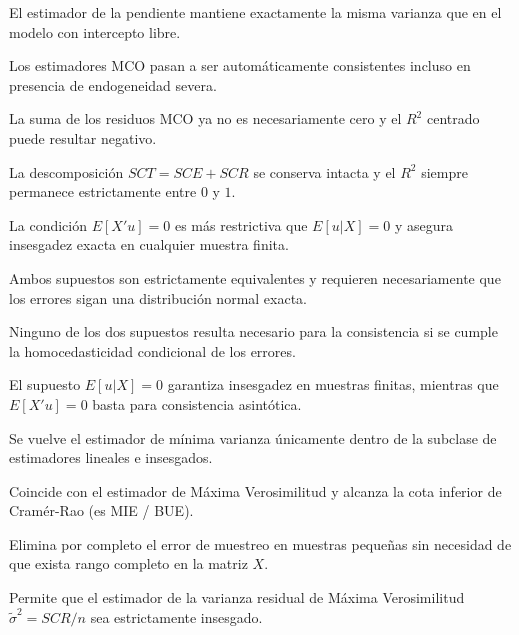 \begin{opts}
    \item El estimador de la pendiente mantiene exactamente la misma varianza que en el modelo con intercepto libre.
    \item Los estimadores MCO pasan a ser automáticamente consistentes incluso en presencia de endogeneidad severa.
    \item La suma de los residuos MCO ya no es necesariamente cero y el $R^2$ centrado puede resultar negativo.
    \item La descomposición $SCT = SCE + SCR$ se conserva intacta y el $R^2$ siempre permanece estrictamente entre $0$ y $1$.
\end{opts}

\begin{opts}
    \item La condición $E[X'u] = 0$ es más restrictiva que $E[u|X] = 0$ y asegura insesgadez exacta en cualquier muestra finita.
    \item Ambos supuestos son estrictamente equivalentes y requieren necesariamente que los errores sigan una distribución normal exacta.
    \item Ninguno de los dos supuestos resulta necesario para la consistencia si se cumple la homocedasticidad condicional de los errores.
    \item El supuesto $E[u|X] = 0$ garantiza insesgadez en muestras finitas, mientras que $E[X'u] = 0$ basta para consistencia asintótica.
\end{opts}

\begin{opts}
    \item Se vuelve el estimador de mínima varianza únicamente dentro de la subclase de estimadores lineales e insesgados.
    \item Coincide con el estimador de Máxima Verosimilitud y alcanza la cota inferior de Cramér-Rao (es MIE / BUE).
    \item Elimina por completo el error de muestreo en muestras pequeñas sin necesidad de que exista rango completo en la matriz $X$.
    \item Permite que el estimador de la varianza residual de Máxima Verosimilitud $\tilde{\sigma}^2 = SCR/n$ sea estrictamente insesgado.
\end{opts}

